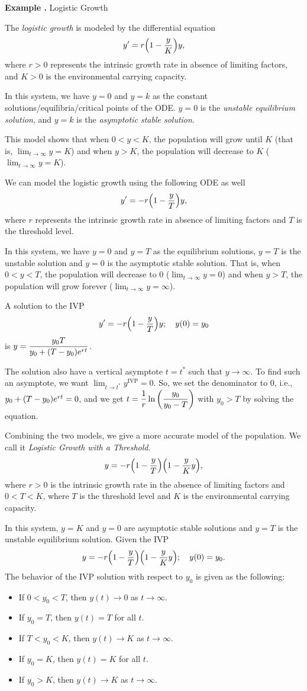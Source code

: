 \documentclass[12pt, a4paper]{article}
\newcounter{index}[subsection]
\newenvironment*{eg}{\begin{framed}\par\noindent\textbf{Example \thesubsection.\stepcounter{index}\theindex}}{\par\end{framed}}
\def\dsst{\displaystyle}
\begin{document}
\begin{eg}
	Logistic Growth \par 
	The \textit{logistic growth} is modeled by the differential equation \[y'=r\qty(1-\dfrac{y}{K})y,\] where $r>0$ represents the intrinsic growth rate in absence of limiting factors, and $K>0$ is the environmental carrying capacity. \par 
	In this system, we have $y=0$ and $y=k$ as the constant solutions/equilibria/critical points of the ODE. $y=0$ is the \textit{unstable equilibrium solution}, and $y=k$ is the \textit{asymptotic stable solution}. \par 
	This model shows that when $0<y<K$, the population will grow until $K$ (that is, $\dsst\lim_{t\to\infty}y=K$) and when $y>K$, the population will decrease to $K$ ($\dsst\lim_{t\to\infty}y=K$).\par 
	We can model the logistic growth using the following ODE as well \[y'=-r\qty(1-\dfrac{y}{T})y,\] where $r$ represents the intrinsic growth rate in absence of limiting factors and $T$ is the threshold level. \par 
	In this system, we have $y=0$ and $y=T$ as the equilibrium solutions, $y=T$ is the unstable solution and $y=0$ is the asymptotic stable solution. That is, when $0<y<T$, the population will decrease to $0$ ($\dsst\lim_{t\to\infty}y=0$) and when $y>T$, the population will grow forever ($\dsst\lim_{t\to\infty}y=\infty$).\par A solution to the IVP \[y'=-r\qty(1-\dfrac{y}{T})y;\quad y(0)=y_0\] is $y=\dfrac{y_0T}{y_0+\qty(T-y_0)e^{rt}}$.\par 
	The solution also have a vertical asymptote $t=t^*$ such that $y\to\infty$. To find such an asymptote, we want $\dsst\lim_{t\to t^*}y^\text{IVP}=0$. So, we set the denominator to $0$, i.e., $y_0+\qty(T-y_0)e^{rt}=0$, and we get $t=\dfrac{1}{r}\ln\qty(\dfrac{y_0}{y_0-T})$ with $y_0>T$ by solving the equation.\par 
	Combining the two models, we give a more accurate model of the population. We call it \textit{Logistic Growth with a Threshold}. \[y=-r\qty(1-\dfrac{y}{T})\qty(1-\dfrac{y}{K}y),\] where $r>0$ is the intrinsic growth rate in the absence of limiting factors and $0<T<K$, where $T$ is the threshold level and $K$ is the environmental carrying capacity. \par In this system, $y=K$ and $y=0$ are asymptotic stable solutions and $y=T$ is the unstable equilibrium solution. Given the IVP \[y=-r\qty(1-\dfrac{y}{T})\qty(1-\dfrac{y}{K}y);\quad y(0)=y_0.\]The behavior of the IVP solution with respect to $y_0$ is given as the following: 
	\begin{itemize}
		\item If $0<y_0<T$, then $y(t)\to0$ as $t\to\infty$.
		\item If $y_0=T$, then $y(t)=T$ for all $t$.
		\item If $T<y_0<K$, then $y(t)\to K$ as $t\to\infty$.
		\item If $y_0=K$, then $y(t)=K$ for all $t$.
		\item If $y_0>K$, then $y(t)\to K$ as $t\to\infty$.
	\end{itemize}
\end{eg}
\end{document}
